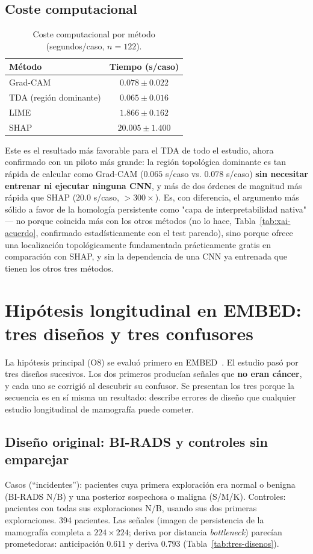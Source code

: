 \subsection{Coste computacional}
\begin{table}[H]
\centering
\caption{Coste computacional por método (segundos/caso, $n=122$).}
\label{tab:xai-coste}
\begin{tabular}{@{}lc@{}}
\toprule
\textbf{Método} & \textbf{Tiempo (s/caso)} \\
\midrule
Grad-CAM & $0.078 \pm 0.022$ \\
TDA (región dominante) & $0.065 \pm 0.016$ \\
LIME     & $1.866 \pm 0.162$ \\
SHAP     & $20.005 \pm 1.400$ \\
\bottomrule
\end{tabular}
\end{table}

Este es el resultado más favorable para el TDA de todo el estudio, ahora
confirmado con un piloto más grande: la región topológica dominante es tan
rápida de calcular como Grad-CAM ($0.065$ s/caso vs. $0.078$ s/caso)
\textbf{sin necesitar entrenar ni ejecutar ninguna CNN}, y más de dos
órdenes de magnitud más rápida que SHAP ($20.0$ s/caso, $>300\times$). Es,
con diferencia, el argumento más sólido a favor de la homología persistente
como "capa de interpretabilidad nativa" --- no porque coincida más con los
otros métodos (no lo hace, Tabla~\ref{tab:xai-acuerdo}, confirmado
estadísticamente con el test pareado), sino porque ofrece una localización
topológicamente fundamentada prácticamente gratis en comparación con SHAP,
y sin la dependencia de una CNN ya entrenada que tienen los otros tres
métodos.

\section{Hipótesis longitudinal en EMBED: tres diseños y tres confusores}
\label{sec:resultados-embed}
La hipótesis principal (O8) se evaluó primero en EMBED~\cite{jeong2021embed}.
El estudio pasó por tres diseños sucesivos. Los dos primeros producían
señales que \textbf{no eran cáncer}, y cada uno se corrigió al descubrir su
confusor. Se presentan los tres porque la secuencia es en sí misma un
resultado: describe errores de diseño que cualquier estudio longitudinal de
mamografía puede cometer.

\subsection{Diseño original: BI-RADS y controles sin emparejar}
Casos (``incidentes''): pacientes cuya primera exploración era normal o
benigna (BI-RADS N/B) y una posterior sospechosa o maligna (S/M/K).
Controles: pacientes con todas sus exploraciones N/B, usando sus dos
primeras exploraciones. 394 pacientes. Las señales (imagen de persistencia
de la mamografía completa a $224\times224$; deriva por distancia
\textit{bottleneck}) parecían prometedoras: anticipación $0.611$ y deriva
$0.793$ (Tabla~\ref{tab:tres-disenos}).

